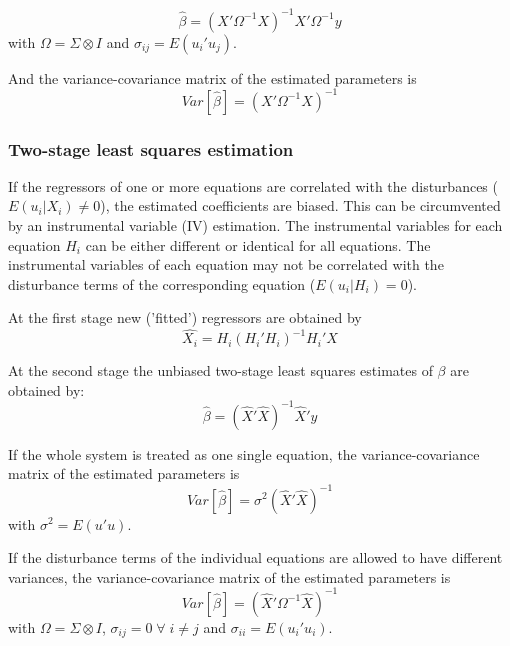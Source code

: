 \documentclass[article]{jss}
\begin{document}
\begin{equation}
   \widehat{\beta} = \left( X' \Omega^{-1} X \right)^{-1} X' \Omega^{-1} y
\end{equation}
with $\Omega = \Sigma \otimes I$ and
$\sigma_{ij} = E \left( u_i' u_j \right)$.

And the variance-covariance matrix of the estimated parameters is
\begin{equation}
   Var \left[ \widehat{\beta} \right] = \left( X' \Omega^{-1} X \right)^{-1}
\end{equation}


\subsubsection{Two-stage least squares estimation}

If the regressors of one or more equations are correlated 
with the disturbances ($E \left( u_i | X_i \right) \neq 0$), 
the estimated coefficients are biased.
This can be circumvented by an instrumental variable (IV) estimation.
The instrumental variables for each equation $H_i$ 
can be either different or identical for all equations.
The instrumental variables of each equation may not be correlated with 
the disturbance terms of the corresponding equation 
($E \left( u_i | H_i \right) = 0$).

At the first stage new ('fitted') regressors are obtained by
\begin{equation}
   \widehat{X_i} = H_i \left( H_i' H_i \right)^{-1} H_i' X
\end{equation}

At the second stage the unbiased two-stage least squares estimates
of $\beta$ are obtained by:
\begin{equation}
   \widehat{\beta} = \left( \widehat{X}' \widehat{X} \right)^{-1} 
   \widehat{X}' y 
   \label{eq:beta2sls}
\end{equation}

If the whole system is treated as one single equation, 
the variance-covariance matrix of the estimated parameters is
\begin{equation}
   Var \left[ \widehat{\beta} \right] = \sigma^2 \left( \widehat{X}'
   \widehat{X} \right)^{-1}
\end{equation}
with $\sigma^2 = E \left( u' u \right)$.

If the disturbance terms of the individual equations 
are allowed to have different variances, 
the variance-covariance matrix of the estimated parameters is
\begin{equation}
   Var \left[ \widehat{\beta} \right] = \left( \widehat{X}' \Omega^{-1} 
   \widehat{X} \right)^{-1}
\end{equation}
with $\Omega = \Sigma \otimes I$, 
$\sigma_{ij} = 0 \; \forall \; i \neq j$ and
$\sigma_{ii} = E \left( u_i' u_i \right)$.
\end{document}
